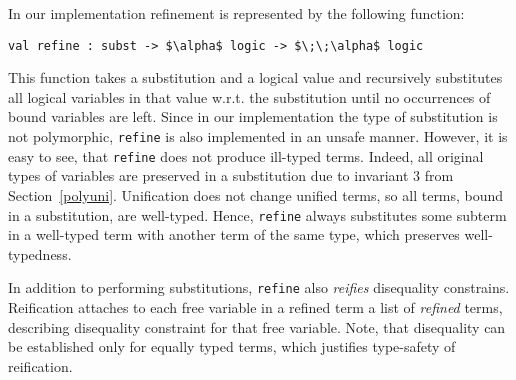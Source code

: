 \documentclass[10pt, oneside, nocopyrightspace]{sigplanconf}
\begin{document}
In our implementation refinement is represented by the following function:

\begin{lstlisting}[mathescape=true]
   val refine : subst -> $\alpha$ logic -> $\;\;\alpha$ logic
\end{lstlisting}

This function takes a substitution and a logical value and recursively substitutes
all logical variables in that value w.r.t. the substitution until no occurrences of 
bound variables are left. Since in our implementation the type of substitution is
not polymorphic, \lstinline{refine} is also implemented in an unsafe manner. However,
it is easy to see, that \lstinline{refine} does not produce ill-typed terms. Indeed,
all original types of variables are preserved in a substitution due to invariant
3 from Section~\ref{polyuni}. Unification does not change unified terms, so all terms, 
bound in a substitution, are well-typed. Hence, \lstinline{refine} always substitutes
some subterm in a well-typed term with another term of the same type, which preserves
well-typedness.

In addition to performing substitutions, \lstinline{refine} also \emph{reifies} 
disequality constrains. Reification attaches to each free variable in a refined
term a list of \emph{refined} terms, describing disequality constraint for that
free variable. Note, that disequality can be established only for equally typed
terms, which justifies type-safety of reification. 

\begin{comment}
Note also, that additional care has 
to be taken to avoid infinite looping, since refinement and reification are
mutually recursive, and refinement of a variable can be potentially invoked from 
itself due to a chain of disequalify constraints.

After refinement the content of logical value can be inspected via the following 
function:

\begin{lstlisting}[mathescape=true]
   val destruct : $\alpha$ logic -> 
     [`Var of int * $\alpha$ logic list | `Value of $\alpha$]
\end{lstlisting}

Constructor \lstinline{`Var} corresponds to a free variable with unique
integer identifier and a list of terms, representing all disequality constraints
for this variable. These terms are refined as well.
\end{comment}
\end{document}
